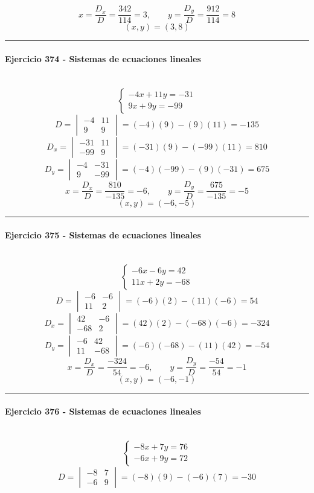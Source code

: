 \documentclass[10pt,a4paper]{article}
\newcommand{\res}[1]{\paragraph{#1}\mbox{}\\[-1.2em]}
\begin{document}
\[ x=\frac{D_x}{D}=\frac{342}{114}=3,\qquad y=\frac{D_y}{D}=\frac{912}{114}=8 \]
\[ \boxed{(x,y)=(3,8)} \]
\vspace{1mm}\hrule\vspace{2mm}
\res{Ejercicio 374 - Sistemas de ecuaciones lineales}
\[ \begin{cases}- 4 x + 11 y=-31\\9 x + 9 y=-99\end{cases} \]
\[ D=\begin{vmatrix}-4&11\\9&9\end{vmatrix}=(-4)(9)-(9)(11)=-135 \]
\[ D_x=\begin{vmatrix}-31&11\\-99&9\end{vmatrix}=(-31)(9)-(-99)(11)=810 \]
\[ D_y=\begin{vmatrix}-4&-31\\9&-99\end{vmatrix}=(-4)(-99)-(9)(-31)=675 \]
\[ x=\frac{D_x}{D}=\frac{810}{-135}=-6,\qquad y=\frac{D_y}{D}=\frac{675}{-135}=-5 \]
\[ \boxed{(x,y)=(-6,-5)} \]
\vspace{1mm}\hrule\vspace{2mm}
\res{Ejercicio 375 - Sistemas de ecuaciones lineales}
\[ \begin{cases}- 6 x - 6 y=42\\11 x + 2 y=-68\end{cases} \]
\[ D=\begin{vmatrix}-6&-6\\11&2\end{vmatrix}=(-6)(2)-(11)(-6)=54 \]
\[ D_x=\begin{vmatrix}42&-6\\-68&2\end{vmatrix}=(42)(2)-(-68)(-6)=-324 \]
\[ D_y=\begin{vmatrix}-6&42\\11&-68\end{vmatrix}=(-6)(-68)-(11)(42)=-54 \]
\[ x=\frac{D_x}{D}=\frac{-324}{54}=-6,\qquad y=\frac{D_y}{D}=\frac{-54}{54}=-1 \]
\[ \boxed{(x,y)=(-6,-1)} \]
\vspace{1mm}\hrule\vspace{2mm}
\res{Ejercicio 376 - Sistemas de ecuaciones lineales}
\[ \begin{cases}- 8 x + 7 y=76\\- 6 x + 9 y=72\end{cases} \]
\[ D=\begin{vmatrix}-8&7\\-6&9\end{vmatrix}=(-8)(9)-(-6)(7)=-30 \]
\end{document}
